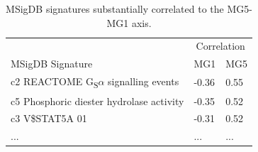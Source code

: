 \documentclass[dissertation.tex]{subfiles}
\begin{document}
\begin{table}[ht]
\caption{\acrshort{MSigDB} signatures substantially correlated to the MG5-MG1 axis.\label{tab:sigs-msigdb-corrs-mg15}}
\centering
\begin{tabularx}{\textwidth}{ @{} X l l @{} }
  \toprule
   & \multicolumn{2}{c}{Correlation} \\
  MSigDB Signature & MG1 & MG5 \\ 
  \midrule
  c2 REACTOME G\textsubscript{S}$\alpha$ signalling events & -0.36 & 0.55 \\ 
  c5 Phosphoric diester hydrolase activity & -0.35 & 0.52 \\ 
  c3 V\$STAT5A 01 & -0.31 & 0.52 \\ 
  ... & ... & ... \\

\end{tabularx}
\end{table}
\end{document}
